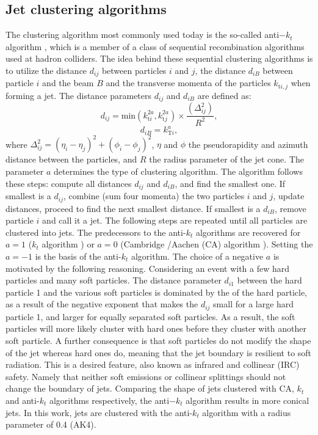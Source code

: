 \subsection*{Jet clustering algorithms}
\noindent\justify
The clustering algorithm most commonly used today is the so-called anti$-k_t$ algorithm \cite{Cacciari:2008gp}, which is a member of a class of sequential recombination algorithms used at hadron colliders. 
The idea behind these sequential clustering algorithms is to utilize the distance $d_{ij}$ between particles $i$ and $j$, the distance $d_{iB}$ between particle $i$ and the beam $B$ and the transverse momenta of the particles $k_{\mathrm{t}i,j}$ when forming a jet. 
The distance parameters $d_{ij}$ and $d_{iB}$ are defined as:
\begin{equation}
d_{ij}=\mathrm{min}(k_{\mathrm{t}i}^{2a}, k_{\mathrm{t}j}^{2a})\times\frac{(\Delta_{ij}^{2})}{R^{2}},
\end{equation}
\begin{equation}
d_{iB}=k_{\mathrm{T}i}^{a},
\end{equation}
where $\Delta_{ij}^{2}=(\eta_{i}-\eta_{j})^{2}+(\phi_{i}-\phi_{j})^{2}$, $\eta$ and $\phi$ the pseudorapidity and azimuth distance between the particles, and $R$ the radius parameter of the jet cone.
The parameter $a$ determines the type of clustering algorithm. 
The algorithm follows these steps: compute all distances $d_{ij}$ and $d_{iB}$, and find the smallest one. 
If smallest is a $d_{ij}$, combine (sum four momenta) the two particles $i$ and $j$, update distances, proceed to find the next smallest distance. 
If smallest is a $d_{iB}$, remove particle $i$ and call it a jet. 
The following steps are repeated until all particles are clustered into jets. 
\newpara
\noindent\justify
The predecessors to the anti-$k_t$ algorithms are recovered for $a=1$ ($k_{t}$ algorithm \cite{Salam:2009jx}) or $a=0$ (Cambridge /Aachen (CA) algorithm \cite{Dokshitzer:1997in}).  
Setting the $a=-1$ is the basis of the anti-$k_t$ algorithm. 
The choice of a negative $a$ is motivated by the following reasoning. 
Considering an event with a few hard particles and many soft particles. 
The distance parameter $d_{i1}$ between the hard particle 1 and the various soft particles is dominated by the \pt of the hard particle, as a result of the negative exponent that makes the $d_{ij}$ small for a large \pt hard particle 1, and larger for equally separated soft particles. 
As a result, the soft particles will more likely cluster with hard ones before they cluster with another soft particle. 
A further consequence is that soft particles do not modify the shape of the jet whereas hard ones do, meaning that the jet boundary is resilient to soft radiation. 
This is a desired feature, also known as infrared and collinear (IRC) safety. Namely that neither soft emissions or collinear splittings should not change the boundary of jets. 
Comparing the shape of jets clustered with CA, $k_t$ and anti-$k_t$ algorithms respectively, the anti$-k_t$ algorithm results in more conical jets.
In this work, jets are clustered with the anti-$k_t$ algorithm with a radius parameter of 0.4 (AK4). 

